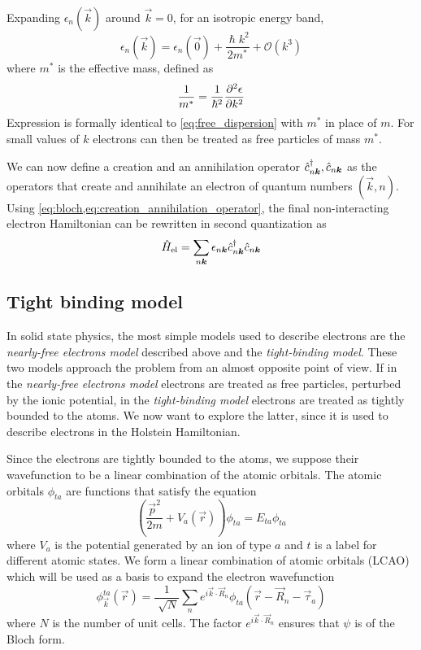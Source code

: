 Expanding $\epsilon_n(\vec{k})$ around $\vec{k} = 0$, for an isotropic energy band,
\begin{equation} \label{eq:effective_mass}
    \epsilon_n(\vec{k}) = \epsilon_n(\vec{0}) + \frac{\hslash k^2}{2m^*} + \mathcal{O}(k^3)
\end{equation}
where $m^*$ is the effective mass, defined as
\begin{equation}
    \frac{1}{m^*} = \frac{1}{\hslash^2} \pdv[2]{\epsilon}{k}
\end{equation}
Expression  is formally identical to \cref{eq:free_dispersion} with $m^*$ in place of $m$. For small values of $k$ electrons can then be treated as free particles of mass $m^*$.

We can now define a creation and an annihilation operator $\hat{c}^\dagger_{n\mathbf{\boldsymbol{k}}}, \hat{c}_{n\mathbf{\boldsymbol{k}}}$ as the operators that create and annihilate an electron of quantum numbers $(\vec{k},n)$. Using \cref{eq:bloch,eq:creation_annihilation_operator}, the final non-interacting electron Hamiltonian can be rewritten in second quantization as
\begin{equation}\label{eq:electron_hamiltonian}
    \hat{H}_\text{el} = \sum_{n\mathbf{\boldsymbol{k}}} \epsilon_{n\mathbf{\boldsymbol{k}}} \hat{c}^\dagger_{n\mathbf{\boldsymbol{k}}}\hat{c}_{n\mathbf{\boldsymbol{k}}}
\end{equation}

\subsection{Tight binding model} \label{sec:tight-binding}
In solid state physics, the most simple models used to describe electrons are the \emph{nearly-free electrons model} described above and the \emph{tight-binding model}. These two models approach the problem from an almost opposite point of view. If in the \emph{nearly-free electrons model} electrons are treated as free particles, perturbed by the ionic potential, in the \emph{tight-binding model} electrons are treated as tightly bounded to the atoms. We now want to explore the latter, since it is used to describe electrons in the Holstein Hamiltonian.

Since the electrons are tightly bounded to the atoms, we suppose their wavefunction to be a linear combination of the atomic orbitals. The atomic orbitals $\phi_{ta}$ are functions that satisfy the equation
\begin{equation}
    \left(\frac{\vec{p}^2}{2m} + V_a(\vec{r}) \right) \phi_{ta} = E_{ta}\phi_{ta}
\end{equation}
where $V_a$ is the potential generated by an ion of type $a$ and $t$ is a label for different atomic states. We form a linear combination of atomic orbitals (LCAO) which will be used as a basis to expand the electron wavefunction
\begin{equation} \label{eq:lcao_tight}
    \phi_\vec{k}^{ta}(\vec{r}) = \frac{1}{\sqrt[]{N}}\sum_{n} e^{i\vec{k}\cdot\vec{R}_n}\phi_{ta}(\vec{r}-\vec{R}_n - \vec{\tau}_a)
\end{equation}
where $N$ is the number of unit cells. The factor $e^{i\vec{k}\cdot\vec{R}_n}$ ensures that $\psi$ is of the Bloch form.

